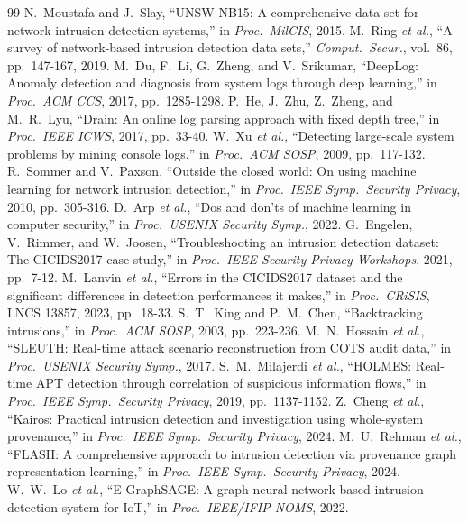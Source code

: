 \documentclass[journal,10pt,twocolumn]{IEEEtran}
\begin{document}
\begin{thebibliography}{99}
 N.~Moustafa and J.~Slay, ``UNSW-NB15: A comprehensive data set for network intrusion detection systems,'' in \emph{Proc.\ MilCIS}, 2015.
 M.~Ring \emph{et al.}, ``A survey of network-based intrusion detection data sets,'' \emph{Comput.\ Secur.}, vol.~86, pp.~147-167, 2019.
 M.~Du, F.~Li, G.~Zheng, and V.~Srikumar, ``DeepLog: Anomaly detection and diagnosis from system logs through deep learning,'' in \emph{Proc.\ ACM CCS}, 2017, pp.~1285-1298.
 P.~He, J.~Zhu, Z.~Zheng, and M.~R.~Lyu, ``Drain: An online log parsing approach with fixed depth tree,'' in \emph{Proc.\ IEEE ICWS}, 2017, pp.~33-40.
 W.~Xu \emph{et al.}, ``Detecting large-scale system problems by mining console logs,'' in \emph{Proc.\ ACM SOSP}, 2009, pp.~117-132.
 R.~Sommer and V.~Paxson, ``Outside the closed world: On using machine learning for network intrusion detection,'' in \emph{Proc.\ IEEE Symp.\ Security Privacy}, 2010, pp.~305-316.
 D.~Arp \emph{et al.}, ``Dos and don'ts of machine learning in computer security,'' in \emph{Proc.\ USENIX Security Symp.}, 2022.
 G.~Engelen, V.~Rimmer, and W.~Joosen, ``Troubleshooting an intrusion detection dataset: The CICIDS2017 case study,'' in \emph{Proc.\ IEEE Security Privacy Workshops}, 2021, pp.~7-12.
 M.~Lanvin \emph{et al.}, ``Errors in the CICIDS2017 dataset and the significant differences in detection performances it makes,'' in \emph{Proc.\ CRiSIS}, LNCS 13857, 2023, pp.~18-33.
 S.~T.~King and P.~M.~Chen, ``Backtracking intrusions,'' in \emph{Proc.\ ACM SOSP}, 2003, pp.~223-236.
 M.~N.~Hossain \emph{et al.}, ``SLEUTH: Real-time attack scenario reconstruction from COTS audit data,'' in \emph{Proc.\ USENIX Security Symp.}, 2017.
 S.~M.~Milajerdi \emph{et al.}, ``HOLMES: Real-time APT detection through correlation of suspicious information flows,'' in \emph{Proc.\ IEEE Symp.\ Security Privacy}, 2019, pp.~1137-1152.
 Z.~Cheng \emph{et al.}, ``Kairos: Practical intrusion detection and investigation using whole-system provenance,'' in \emph{Proc.\ IEEE Symp.\ Security Privacy}, 2024.
 M.~U.~Rehman \emph{et al.}, ``FLASH: A comprehensive approach to intrusion detection via provenance graph representation learning,'' in \emph{Proc.\ IEEE Symp.\ Security Privacy}, 2024.
 W.~W.~Lo \emph{et al.}, ``E-GraphSAGE: A graph neural network based intrusion detection system for IoT,'' in \emph{Proc.\ IEEE/IFIP NOMS}, 2022.

\end{thebibliography}
\end{document}
